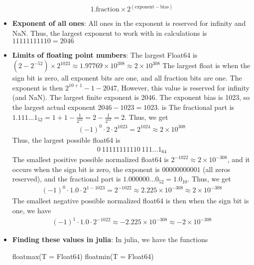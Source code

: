 \documentclass{report}
\begin{document}
\begin{itemize}
        \[
            1.\text{fraction} \times 2^{(\text{exponent} - \text{bias})}
        \]
    \item \textbf{Exponent of all ones}: All ones in the exponent is reserved for  infinity and NaN. Thus, the largest exponent to work with in calculations is $11111111110 = 2046$
    \item \textbf{Limits of floating point numbers}: The largest Float64 is $(2-2^{-52}) \times 2^{1023} \approx 1.97769 \times 10^{308} \approx  2\times 10^{308}$
        \bigbreak \noindent 
        The largest float is when the sign bit is zero, all exponent bits are one, and all fraction bits are one. The exponent is then $2^{10 + 1}- 1 - 2047$, However, this value is reserved for infinity (and NaN). The largest finite exponent is 2046. The exponent bias is 1023, so the largest actual exponent $2046 - 1023 = 1023$. is The fractional part is $1.111...1_{52} = 1 + 1-\frac{1}{2^{52}} = 2-\frac{1}{2^{52} } = 2$. Thus, we get
        \begin{align*}
            (-1)^{0} \cdot 2 \cdot 2^{1023} = 2^{1024} \approx 2\times 10^{308}
        \end{align*}
        \bigbreak \noindent 
        Thus, the largest possible float64 is
        \begin{align*}
            0\ 11111111110\ 111...1_{64}
        \end{align*}
        \bigbreak \noindent 
        The smallest positive possible normalized float64 is $2^{-1022} \approx 2\times 10^{-308} $, and it occurs when the sign bit is zero, the exponent is $00000000001$ (all zeros reserved), and the fractional part is $1.000000...0_{52} = 1.0_{10}$. Thus, we get
        \begin{align*}
            (-1)^{0} \cdot  1.0 \cdot 2^{1-1023} = 2^{-1022} \approx 2.225 \times 10^{-308} \approx 2 \times 10^{-308}
        \end{align*}
        \bigbreak \noindent 
        The smallest negative possible normalized float64 is then when the sign bit is one, we have
        \begin{align*}
            (-1)^{1} \cdot 1.0 \cdot 2^{-1022} \approx -2.225 \times 10^{-308} \approx -2 \times 10^{-308}
        \end{align*}
    \item \textbf{Finding these values in julia}: In julia, we have the functions
        \bigbreak \noindent 
        \begin{jlcode}
        floatmax(T = Float64)
        floatmin(T = Float64)

\end{jlcode}
\end{itemize}
\end{document}
